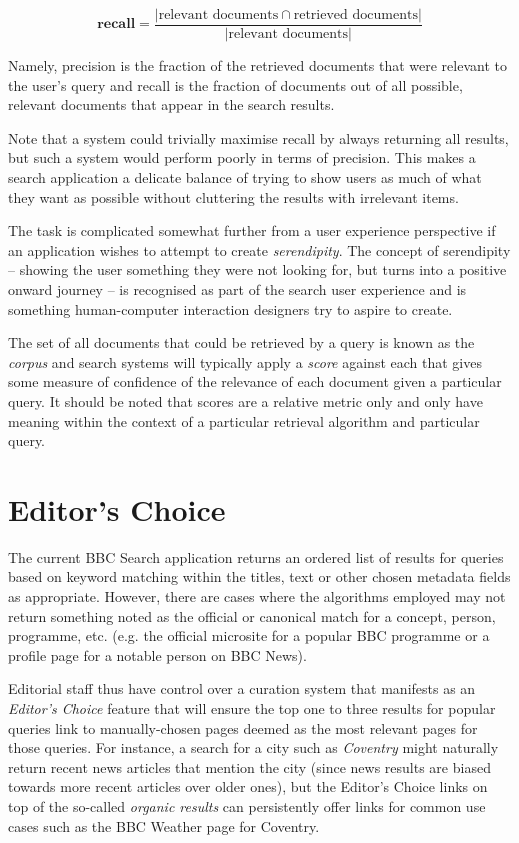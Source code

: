 \begin{displaymath}
  \textbf{recall} = \frac{
    |\text{relevant documents} \cap \text{retrieved documents}|
  }{
    |\text{relevant documents}|
  }
\end{displaymath}

Namely, precision is the fraction of the retrieved documents that were
relevant to the user's query and recall is the fraction of documents out of
all possible, relevant documents that appear in the search results.

Note that a system could trivially maximise recall by always returning all
results, but such a system would perform poorly in terms of precision.
This makes a search application a delicate balance of trying to show
users as much of what they want as possible without cluttering the results
with irrelevant items.

The task is complicated somewhat further from a user experience perspective
if an application wishes to attempt to create \emph{serendipity}. The
concept of serendipity -- showing the user something they were not looking
for, but turns into a positive onward journey -- is recognised
as part of the search user experience and is something human-computer
interaction designers try to aspire to create.\cite{russell2012designing}

The set of all documents that could be retrieved by a query is known as the
\emph{corpus} and search systems will typically apply a \emph{score} against
each that gives some measure of confidence of the relevance of each document
given a particular query. It should be noted that scores are a relative
metric only and only have meaning within the context of a particular
retrieval algorithm and particular query.

\section{Editor's Choice}

The current BBC Search application returns an ordered list of results
for queries based on keyword matching within the titles, text or other
chosen metadata fields as appropriate. However, there are cases where
the algorithms employed may not return something noted as the official
or canonical match for a concept, person, programme, etc. (e.g. the
official microsite for a popular BBC programme or a profile page for
a notable person on BBC News).

Editorial staff thus have control over a curation system that manifests
as an \emph{Editor's Choice} feature that will ensure the top one to three
results for popular queries link to manually-chosen pages deemed as the most
relevant pages for those queries. For instance, a search for a city such
as \emph{Coventry} might naturally return recent news articles that mention the
city (since news results are biased towards more recent articles over older
ones), but the Editor's Choice links on top of the so-called \emph{organic
results} can persistently offer links for common use cases such as
the BBC Weather page for Coventry.
